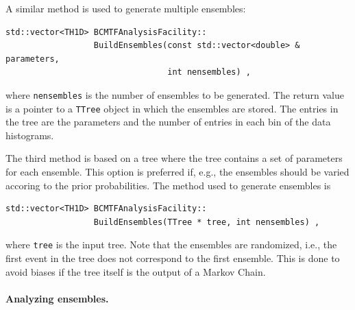 \documentclass[11pt, a4paper]{article}
\begin{document}
A similar method is used to generate multiple ensembles:
%
\begin{verbatim}
std::vector<TH1D> BCMTFAnalysisFacility::
                  BuildEnsembles(const std::vector<double> & parameters,
                                 int nensembles) ,
\end{verbatim}
%
where \verb|nensembles| is the number of ensembles to be
generated. The return value is a pointer to a \verb|TTree| object in
which the ensembles are stored. The entries in the tree are the
parameters and the number of entries in each bin of the data
histograms.

The third method is based on a tree where the tree contains a set of
parameters for each ensemble. This option is preferred if, e.g., the
ensembles should be varied accoring to the prior probabilities. The
method used to generate ensembles is
%
\begin{verbatim}
std::vector<TH1D> BCMTFAnalysisFacility::
                  BuildEnsembles(TTree * tree, int nensembles) ,
\end{verbatim}
%
where \verb|tree| is the input tree. Note that the ensembles are
randomized, i.e., the first event in the tree does not correspond to
the first ensemble. This is done to avoid biases if the tree itself is
the output of a Markov Chain.

\paragraph{Analyzing ensembles.}
\end{document}
